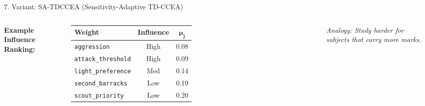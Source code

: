 \documentclass[aspectratio=169, 11pt]{beamer}
\begin{document}
\begin{frame}{7. Variant: SA-TDCCEA (Sensitivity-Adaptive TD-CCEA)}
\begin{columns}[T]
        \vspace{0.2cm}
        \textbf{\textcolor{amritaMaroon}{Example Influence Ranking:}}
        {\footnotesize
        \begin{tabular}{lcc}
            \toprule
            \textbf{Weight} & \textbf{Influence} & $\boldsymbol{\mu_j}$ \\
            \midrule
            \texttt{aggression} & High & 0.08 \\
            \texttt{attack\_threshold} & High & 0.09 \\
            \texttt{light\_preference} & Med & 0.14 \\
            \texttt{second\_barracks} & Low & 0.19 \\
            \texttt{scout\_priority} & Low & 0.20 \\
            \bottomrule
        \end{tabular}
        }

        \vspace{0.15cm}
        {\scriptsize \textit{Analogy: Study harder for subjects that carry more marks.}}
    \end{columns}
\end{frame}
\end{document}

